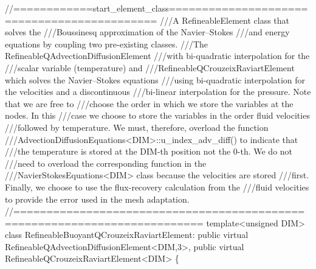  
\begin{DoxyCodeInclude}
\textcolor{comment}{//============start\_element\_class============================================}
\textcolor{comment}{///A RefineableElement class that solves the }
\textcolor{comment}{}\textcolor{comment}{///Boussinesq approximation of the Navier--Stokes}
\textcolor{comment}{}\textcolor{comment}{///and energy equations by coupling two pre-existing classes. }
\textcolor{comment}{}\textcolor{comment}{///The RefineableQAdvectionDiffusionElement }
\textcolor{comment}{}\textcolor{comment}{///with bi-quadratic interpolation for the}
\textcolor{comment}{}\textcolor{comment}{///scalar variable (temperature) and}
\textcolor{comment}{}\textcolor{comment}{///RefineableQCrouzeixRaviartElement which solves the Navier--Stokes equations}
\textcolor{comment}{}\textcolor{comment}{///using bi-quadratic interpolation for the velocities and a discontinuous}
\textcolor{comment}{}\textcolor{comment}{///bi-linear interpolation for the pressure. Note that we are free to }
\textcolor{comment}{}\textcolor{comment}{///choose the order in which we store the variables at the nodes. In this}
\textcolor{comment}{}\textcolor{comment}{///case we choose to store the variables in the order fluid velocities}
\textcolor{comment}{}\textcolor{comment}{///followed by temperature. We must, therefore, overload the function}
\textcolor{comment}{}\textcolor{comment}{///AdvectionDiffusionEquations<DIM>::u\_index\_adv\_diff() to indicate that}
\textcolor{comment}{}\textcolor{comment}{///the temperature is stored at the DIM-th position not the 0-th. We do not}
\textcolor{comment}{}\textcolor{comment}{///need to overload the corresponding function in the }
\textcolor{comment}{}\textcolor{comment}{///NavierStokesEquations<DIM> class because the velocities are stored}
\textcolor{comment}{}\textcolor{comment}{///first. Finally, we choose to use the flux-recovery calculation from the}
\textcolor{comment}{}\textcolor{comment}{///fluid velocities to provide the error used in the mesh adaptation.}
\textcolor{comment}{}\textcolor{comment}{//==========================================================================}
\textcolor{keyword}{template}<\textcolor{keywordtype}{unsigned} DIM>
\textcolor{keyword}{class }RefineableBuoyantQCrouzeixRaviartElement: 
\textcolor{keyword}{public} \textcolor{keyword}{virtual} RefineableQAdvectionDiffusionElement<DIM,3>,
\textcolor{keyword}{public} \textcolor{keyword}{virtual} RefineableQCrouzeixRaviartElement<DIM>
\{

\end{DoxyCodeInclude}



